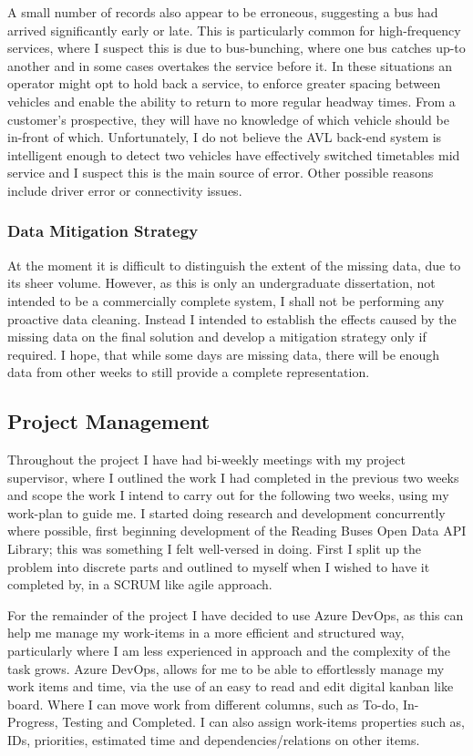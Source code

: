 \documentclass{article}
\begin{document}
\par 
A small number of records also appear to be erroneous, suggesting a bus had arrived significantly early or  late. This is particularly common for high-frequency services, where I suspect this is due to bus-bunching, where one bus catches up-to another and in some cases overtakes the service before it. In these situations an operator might opt to hold back a service, to enforce greater spacing between vehicles and enable the ability to return to more regular headway times. From a customer's prospective, they will have no knowledge of which vehicle should be in-front of which. Unfortunately, I do not believe the AVL back-end system is intelligent enough to detect two vehicles have effectively switched timetables mid service and I suspect this is the main source of error. Other possible reasons include driver error or connectivity issues. 

\subsubsection{Data Mitigation Strategy}
At the moment it is difficult to distinguish the extent of the missing data, due to its sheer volume. However, as this is only an undergraduate dissertation, not intended to be a commercially complete system, I shall not be performing any proactive data cleaning. Instead I intended to establish the effects caused by the missing data on the final solution and develop a mitigation strategy only if required. I hope, that while some days are missing data, there will be enough data from other weeks to still provide a complete representation.


\subsection{Project Management}
Throughout the project I have had bi-weekly meetings with my project supervisor, where I outlined the work I had completed in the previous two weeks and scope the work I intend to carry out for the following two weeks, using my work-plan to guide me. I started doing research and development concurrently where possible, first beginning development of the Reading Buses Open Data API Library; this was something I felt well-versed in doing. First I split up the problem into discrete parts and outlined to myself when I wished to have it completed by, in a SCRUM like agile approach.

\par 
For the remainder of the project I have decided to use Azure DevOps, as this can help me manage my work-items in a more efficient and structured way, particularly where I am less experienced in approach and the complexity of the task grows. Azure DevOps, allows for me to be able to effortlessly manage my work items and time, via the use of an easy to read and edit digital kanban like board. Where I can move work from different columns, such as To-do, In-Progress, Testing and Completed. I can also assign work-items properties such as, IDs, priorities, estimated time and dependencies/relations on other items. 
\end{document}
